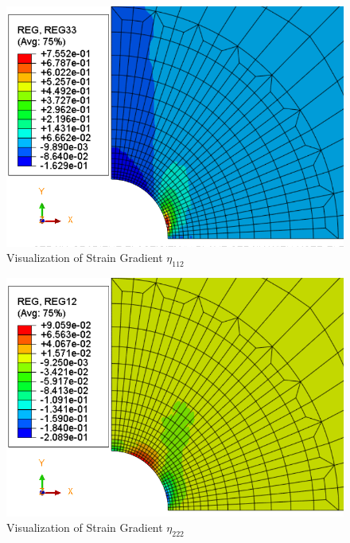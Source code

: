 \documentclass[12pt]{article}
\begin{document}
\begin{figure}[H]
	\begin{center}
		\includegraphics[scale=0.8]{Reg33_crop.png} 
	\end{center}  
   \caption{Visualization of Strain Gradient $\eta_{112} $}
\end{figure}
\begin{figure}[H]
	\begin{center}
		\includegraphics[scale=0.8]{Reg12_crop.png} 
	\end{center}  
   \caption{Visualization of Strain Gradient $\eta_{222} $}
\end{figure}
\end{document}

